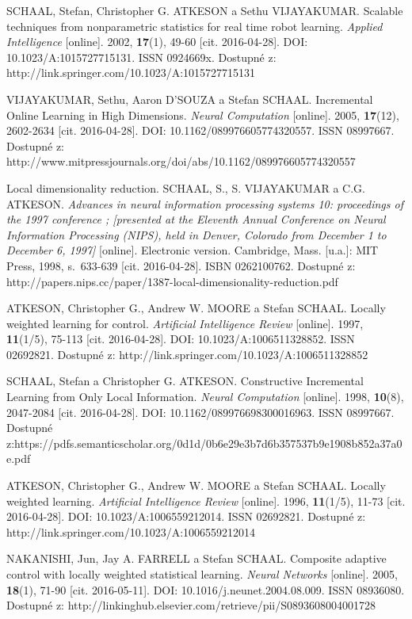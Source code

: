 \begin{thebibliography}{14}
	SCHAAL, Stefan, Christopher G. ATKESON a Sethu VIJAYAKUMAR. Scalable techniques from nonparametric statistics for real time robot learning. \textit{Applied Intelligence} [online]. 2002, \textbf{17}(1), 49-60 [cit. 2016-04-28]. DOI: 10.1023/A:1015727715131. ISSN 0924669x. Dostupné z: http://link.springer.com/10.1023/A:1015727715131
	
	VIJAYAKUMAR, Sethu, Aaron D'SOUZA a Stefan SCHAAL. Incremental Online Learning in High Dimensions. \textit{Neural Computation} [online]. 2005, \textbf{17}(12), 2602-2634 [cit. 2016-04-28]. DOI: 10.1162/089976605774320557. ISSN 08997667. Dostupné z: http://www.mitpressjournals.org/doi/abs/10.1162/089976605774320557
	
	Local dimensionality reduction. SCHAAL, S., S. VIJAYAKUMAR a C.G. ATKESON. \textit{Advances in neural information processing systems 10: proceedings of the 1997 conference ; [presented at the Eleventh Annual Conference on Neural Information Processing (NIPS), held in Denver, Colorado from December 1 to December 6, 1997]} [online]. Electronic version. Cambridge, Mass. [u.a.]: MIT Press, 1998, s.~633-639 [cit. 2016-04-28]. ISBN 0262100762. Dostupné z: http://papers.nips.cc/paper/1387-local-dimensionality-reduction.pdf
	
	ATKESON, Christopher G., Andrew W. MOORE a Stefan SCHAAL. Locally weighted learning for control. \textit{Artificial Intelligence Review} [online]. 1997, \textbf{11}(1/5), 75-113 [cit. 2016-04-28]. DOI: 10.1023/A:1006511328852. ISSN 02692821. Dostupné z: http://link.springer.com/10.1023/A:1006511328852
	
	SCHAAL, Stefan a Christopher G. ATKESON. Constructive Incremental Learning from Only Local Information. \textit{Neural Computation} [online]. 1998, \textbf{10}(8), 2047-2084 [cit. 2016-04-28]. DOI: 10.1162/089976698300016963. ISSN 08997667. Dostupné z:https://pdfs.semanticscholar.org/0d1d/0b6e29e3b7d6b357537b9e1908b852a37a0e.pdf
	
	ATKESON, Christopher G., Andrew W. MOORE a Stefan SCHAAL. Locally weighted learning. \textit{Artificial Intelligence Review} [online]. 1996, \textbf{11}(1/5), 11-73 [cit. 2016-04-28]. DOI: 10.1023/A:1006559212014. ISSN 02692821. Dostupné z: http://link.springer.com/10.1023/A:1006559212014
	
	NAKANISHI, Jun, Jay A. FARRELL a Stefan SCHAAL. Composite adaptive control with locally weighted statistical learning. \textit{Neural Networks} [online]. 2005, \textbf{18}(1), 71-90 [cit. 2016-05-11]. DOI: 10.1016/j.neunet.2004.08.009. ISSN 08936080. Dostupné z: http://linkinghub.elsevier.com/retrieve/pii/S0893608004001728
	
\end{thebibliography}